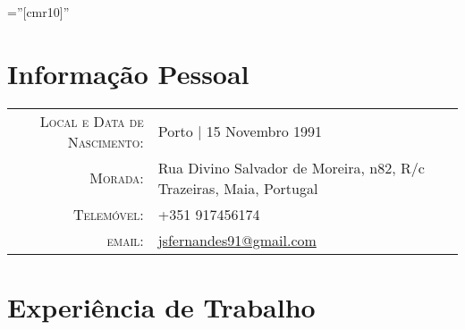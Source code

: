 \documentclass[a4paper,10pt]{article} %
\begin{document}
\pagestyle{empty} %

\font\fb=''[cmr10]'' %


\par{\bigskip\par} %

\section{Informação Pessoal}

\begin{tabular}{rl}
\textsc{Local e Data de Nascimento:} & Porto  | 15 Novembro 1991 \\
\textsc{Morada:} & Rua Divino Salvador de Moreira, n82, R/c Trazeiras, Maia, Portugal \\
\textsc{Telemóvel:} & +351 917456174\\
\textsc{email:} & \href{mailto:jsfernandes91@gmail.com}{jsfernandes91@gmail.com}
\end{tabular}


\section{Experiência de Trabalho}
\end{document}
